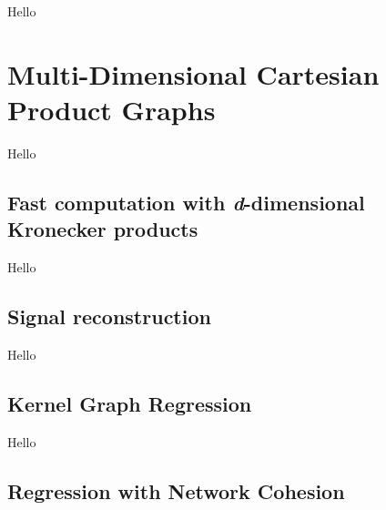Hello


\section{Multi-Dimensional Cartesian Product Graphs}

\label{sec:nd_gsp}

Hello

\subsection{Fast computation with \textit{d}-dimensional Kronecker products}

Hello

\subsection{Signal reconstruction}

Hello

\subsection{Kernel Graph Regression}

Hello

\subsection{Regression with Network Cohesion}


